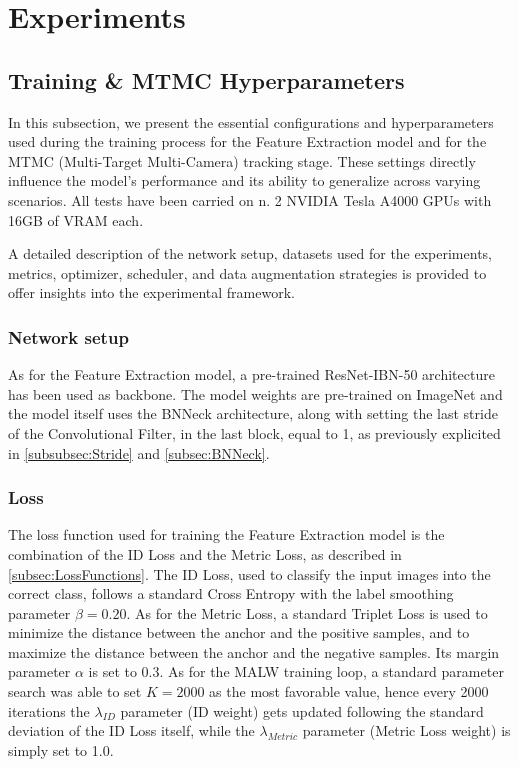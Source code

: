 \chapter{Experiments}
\label{chap:Experiments}

\section{Training \& MTMC Hyperparameters}
In this subsection, we present the essential configurations and hyperparameters used during the training process for the Feature Extraction model and for the MTMC (Multi-Target Multi-Camera) tracking stage. These settings directly influence the model's performance and its ability to generalize across varying scenarios. All tests have been carried on n. 2 NVIDIA Tesla A4000 GPUs with 16GB of VRAM each.

A detailed description of the network setup, datasets used for the experiments, metrics, optimizer, scheduler, and data augmentation strategies is provided to offer insights into the experimental framework.

\subsection{Network setup}
As for the Feature Extraction model, a pre-trained ResNet-IBN-50 architecture has been used as backbone. The model weights are pre-trained on ImageNet and the model itself uses the BNNeck architecture, along with setting the last stride of the Convolutional Filter, in the last block, equal to 1, as previously explicited in \ref{subsubsec:Stride} and \ref{subsec:BNNeck}.

\subsection{Loss}
The loss function used for training the Feature Extraction model is the combination of the ID Loss and the Metric Loss, as described in \ref{subsec:LossFunctions}. The ID Loss, used to classify the input images into the correct class, follows a standard Cross Entropy with the label smoothing parameter $\beta = 0.20$. As for the Metric Loss, a standard Triplet Loss is used to minimize the distance between the anchor and the positive samples, and to maximize the distance between the anchor and the negative samples. Its margin parameter $\alpha$ is set to 0.3.
As for the MALW training loop, a standard parameter search was able to set $K = 2000$ as the most favorable value, hence every 2000 iterations the $\lambda_{ID}$ parameter (ID weight) gets updated following the standard deviation of the ID Loss itself, while the $\lambda_{Metric}$ parameter (Metric Loss weight) is simply set to 1.0.

